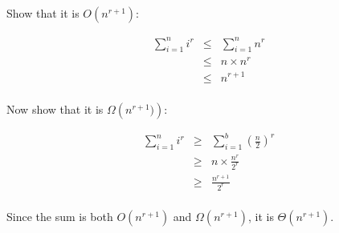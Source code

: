 \documentclass[12pt]{article}
\begin{document}
Show that it is $O\left(n^{r+1}\right)$:

\begin{eqnarray*}
\sum_{i=1}^n \left.i^r\right.
	& \le & \sum_{i=1}^n \left.n^r\right. \\
	& \le & n \times n^r \\
	& \le & n^{r+1} \\
\end{eqnarray*}

Now show that it is $\Omega\left(n^{r+1})\right)$:

\begin{eqnarray*}
\sum_{i=1}^n\left.i^r\right.
	& \ge & \sum_{i=1}^b \left.\left(\frac{n}{2}\right)^r\right. \\
	& \ge & n \times \frac{n^r}{2^r} \\
	& \ge & \frac{n^{r+1}}{2^r} \\
\end{eqnarray*}

Since the sum is both $O\left(n^{r+1}\right)$ and $\Omega\left(n^{r+1}\right)$, it is $\Theta\left(n^{r+1}\right)$.
\end{document}
